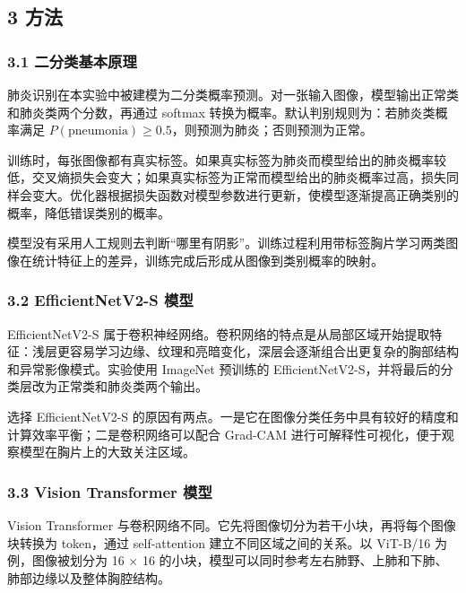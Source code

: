 \documentclass[
]{ctexart}
\begin{document}
\hypertarget{ux65b9ux6cd5}{%
\subsection{3 方法}\label{ux65b9ux6cd5}}

\hypertarget{ux4e8cux5206ux7c7bux57faux672cux539fux7406}{%
\subsubsection{3.1
二分类基本原理}\label{ux4e8cux5206ux7c7bux57faux672cux539fux7406}}

肺炎识别在本实验中被建模为二分类概率预测。对一张输入图像，模型输出正常类和肺炎类两个分数，再通过
softmax 转换为概率。默认判别规则为：若肺炎类概率满足
\(P(\mathrm{pneumonia}) \ge 0.5\)，则预测为肺炎；否则预测为正常。

训练时，每张图像都有真实标签。如果真实标签为肺炎而模型给出的肺炎概率较低，交叉熵损失会变大；如果真实标签为正常而模型给出的肺炎概率过高，损失同样会变大。优化器根据损失函数对模型参数进行更新，使模型逐渐提高正确类别的概率，降低错误类别的概率。

模型没有采用人工规则去判断``哪里有阴影''。训练过程利用带标签胸片学习两类图像在统计特征上的差异，训练完成后形成从图像到类别概率的映射。

\hypertarget{efficientnetv2-s-ux6a21ux578b}{%
\subsubsection{3.2 EfficientNetV2-S
模型}\label{efficientnetv2-s-ux6a21ux578b}}

EfficientNetV2-S
属于卷积神经网络。卷积网络的特点是从局部区域开始提取特征：浅层更容易学习边缘、纹理和亮暗变化，深层会逐渐组合出更复杂的胸部结构和异常影像模式。实验使用
ImageNet 预训练的
EfficientNetV2-S，并将最后的分类层改为正常类和肺炎类两个输出。

选择 EfficientNetV2-S
的原因有两点。一是它在图像分类任务中具有较好的精度和计算效率平衡；二是卷积网络可以配合
Grad-CAM 进行可解释性可视化，便于观察模型在胸片上的大致关注区域。

\hypertarget{vision-transformer-ux6a21ux578b}{%
\subsubsection{3.3 Vision Transformer
模型}\label{vision-transformer-ux6a21ux578b}}

Vision Transformer
与卷积网络不同。它先将图像切分为若干小块，再将每个图像块转换为
token，通过 self-attention 建立不同区域之间的关系。以 ViT-B/16
为例，图像被划分为 16 × 16
的小块，模型可以同时参考左右肺野、上肺和下肺、肺部边缘以及整体胸腔结构。
\end{document}
